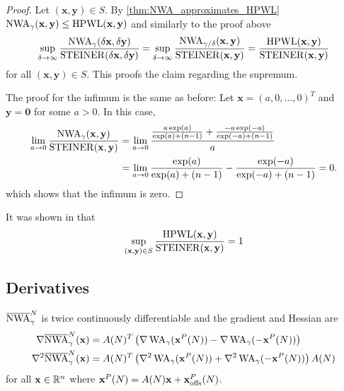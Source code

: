 \begin{proof}
 Let \((\mathbf{x}, \mathbf{y}) \in S \).
 By \cref{thm:NWA_approximates_HPWL} \(\operatorname{NWA}_\gamma(\mathbf{x}, \mathbf{y}) \leq \operatorname{HPWL}(\mathbf{x}, \mathbf{y})\) and similarly to the proof above
 \[
      \sup_{\delta \to \infty} \frac{\operatorname{NWA}_\gamma (\delta \mathbf{x}, \delta \mathbf{y})}{\operatorname{STEINER}(\delta \mathbf{x}, \delta \mathbf{y})} 
    = \sup_{\delta \to \infty} \frac{\operatorname{NWA}_{\gamma/\delta} (\mathbf{x}, \mathbf{y})}{\operatorname{STEINER}(\mathbf{x}, \mathbf{y})}
    = \frac{\operatorname{HPWL}(\mathbf{x}, \mathbf{y})}{\operatorname{STEINER}(\mathbf{x}, \mathbf{y})}
 \]
 for all \((\mathbf{x}, \mathbf{y}) \in S \). This proofs the claim regarding the supremum.
 
 The proof for the infimum is the same as before: 
 Let \(\mathbf{x} = (a, 0, \ldots, 0)^T \) and \(\mathbf{y} = \mathbf{0}\) for some \(a > 0\).
 In this case,
 \begin{align*}
      \lim_{a \to 0} \frac{\operatorname{NWA}_\gamma(\mathbf{x}, \mathbf{y})}{\operatorname{STEINER}(\mathbf{x}, \mathbf{y})} 
    &= \lim_{a \to 0} \frac{\frac{a \exp(a)}{\exp(a) + (n-1)} + \frac{-a \exp(-a)}{\exp(-a) + (n-1)}}{a} \\
    &= \lim_{a \to 0} \frac{\exp(a)}{\exp(a) + (n-1)} - \frac{\exp(-a)}{\exp(-a) + (n-1)}
    = 0 .
 \end{align*}
 which shows that the infimum is zero.
\end{proof}


\begin{remark}
 It was shown in \cite{BrennerVygen-WorstCaseRatiosOfNetworksInTheRectilinearPlane} that 
 \[\sup_{(\mathbf{x}, \mathbf{y}) \in S} \frac{\operatorname{HPWL}(\mathbf{x}, \mathbf{y})}{\operatorname{STEINER}(\mathbf{x}, \mathbf{y})} = 1 \]
\end{remark}



\subsection{Derivatives} \label{sec:NWA_derivatives}

\begin{corollary} \label{thm:NWA_derivatives}
 \(\overline{\operatorname{NWA}}_\gamma^N\) is twice continuously differentiable and the gradient and Hessian are
 \begin{align*}
  \nabla \overline{\operatorname{NWA}}_\gamma^N (\mathbf{x})   &= A(N)^T \left({\nabla \operatorname{WA}_{\gamma}(\mathbf{x}^P(N)) - \nabla \operatorname{WA}_{\gamma}(-\mathbf{x}^P(N))}\right) \\
  \nabla^2 \overline{\operatorname{NWA}}_\gamma^N (\mathbf{x}) &= A(N)^T \left({\nabla^2 \operatorname{WA}_{\gamma}(\mathbf{x}^P(N)) + \nabla^2 \operatorname{WA}_{\gamma}(-\mathbf{x}^P(N))}\right) A(N)
 \end{align*}
 for all \(\mathbf{x} \in \mathbb{R}^n\) where \( \mathbf{x}^P(N) = A(N) \mathbf{x} + \mathbf{x}_{\operatorname{offs}}^P(N) \).
\end{corollary}


